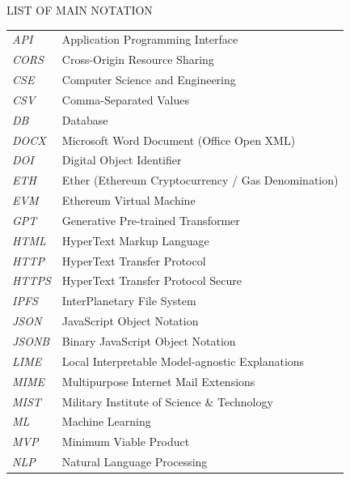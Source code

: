 \clearpage
\newpage
\begin{center}
  {\Large LIST OF MAIN NOTATION}\\[60pt]
\end{center}
\noindent
\begin{longtable}[l]{p{80pt}p{300pt}}

\emph{API}        & Application Programming Interface\\
\emph{CORS}       & Cross-Origin Resource Sharing\\
\emph{CSE}        & Computer Science and Engineering\\
\emph{CSV}        & Comma-Separated Values\\
\emph{DB}         & Database\\
\emph{DOCX}       & Microsoft Word Document (Office Open XML)\\
\emph{DOI}        & Digital Object Identifier\\
\emph{ETH}        & Ether (Ethereum Cryptocurrency / Gas Denomination)\\
\emph{EVM}        & Ethereum Virtual Machine\\
\emph{GPT}        & Generative Pre-trained Transformer\\
\emph{HTML}       & HyperText Markup Language\\
\emph{HTTP}       & HyperText Transfer Protocol\\
\emph{HTTPS}      & HyperText Transfer Protocol Secure\\
\emph{IPFS}       & InterPlanetary File System\\
\emph{JSON}       & JavaScript Object Notation\\
\emph{JSONB}      & Binary JavaScript Object Notation\\
\emph{LIME}       & Local Interpretable Model-agnostic Explanations\\
\emph{MIME}       & Multipurpose Internet Mail Extensions\\
\emph{MIST}       & Military Institute of Science \& Technology\\
\emph{ML}         & Machine Learning\\
\emph{MVP}        & Minimum Viable Product\\
\emph{NLP}        & Natural Language Processing\\

\end{longtable}
